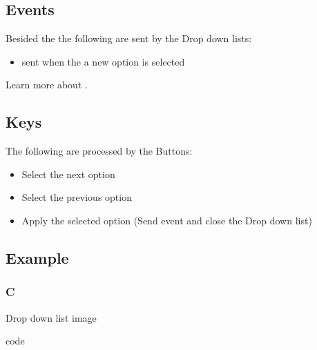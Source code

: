 \documentclass[letterpaper,10pt,english]{sphinxmanual}
\begin{document}
\subsection{Events}
\label{\detokenize{object-types/ddlist:events}}
Besided the  the following  are sent by the Drop down lists:
\begin{itemize}
\item {} 
 sent when the a new option is selected

\end{itemize}

Learn more about {\hyperref[\detokenize{overview/events::doc}]{}}.


\subsection{Keys}
\label{\detokenize{object-types/ddlist:keys}}
The following  are processed by the Buttons:
\begin{itemize}
\item {} 
 Select the next option

\item {} 
 Select the previous option

\item {} 
 Apply the selected option (Send  event and close the Drop down list)

\end{itemize}


\subsection{Example}
\label{\detokenize{object-types/ddlist:example}}

\subsubsection{C}
\label{\detokenize{object-types/ddlist:c}}
Drop down list image

code
\end{document}
